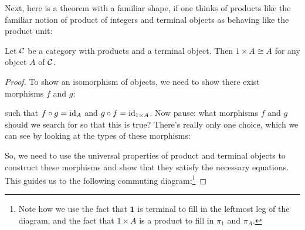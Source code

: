 Next, here is a theorem with a familiar shape, if one thinks of
products like the familiar notion of product of integers and terminal
objects as behaving like the product unit:

\begin{proposition}
  Let \(\mathcal C\) be a category with products and a terminal object.
  Then \(1 \times A \cong A\) for any object \(A\) of \(\mathcal C\).
\end{proposition}
\begin{proof}
  To show an isomorphism of objects, we need to show there exist
  morphisms $f$ and $g$:
  \begin{center}
  \end{center}
  such that $f \circ g = \operatorname{id}_A$ and $g \circ f = \operatorname{id}_{1 \times A}$.
  Now pause: what morphisms $f$ and $g$ should we search for so that this is true? There's
  really only one choice, which we can see by looking at the types of these morphisms:
  \begin{center}
  \end{center}

  So, we need to use the universal properties of product and terminal objects to
  construct these morphisms and show that they satisfy the necessary equations.
  This guides us to the following commuting diagram:\footnote{Note how we use
  the fact that $\mathbf{1}$ is terminal to fill in the leftmost leg of the diagram,
  and the fact that $1 \times A$ is a product to fill in $\pi_1$ and $\pi_A$.}


\end{proof}
